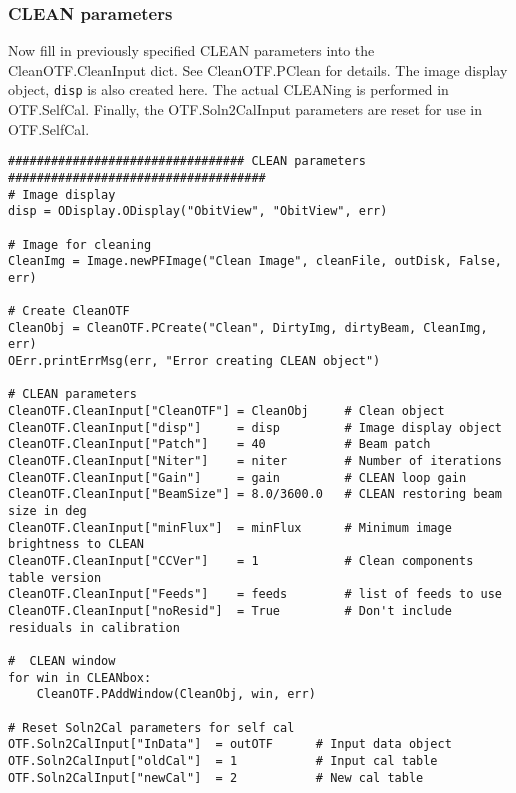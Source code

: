 \documentclass[11pt]{report}
\begin{document}
\subsubsection{CLEAN parameters}
Now fill in previously specified CLEAN parameters into the CleanOTF.CleanInput dict.
See CleanOTF.PClean for details.
The image display object, {\tt disp} is also created here.
The actual CLEANing is performed in OTF.SelfCal.
Finally, the OTF.Soln2CalInput parameters are reset for use in OTF.SelfCal.
\begin{verbatim}
################################# CLEAN parameters ####################################
# Image display
disp = ODisplay.ODisplay("ObitView", "ObitView", err)

# Image for cleaning
CleanImg = Image.newPFImage("Clean Image", cleanFile, outDisk, False, err)

# Create CleanOTF
CleanObj = CleanOTF.PCreate("Clean", DirtyImg, dirtyBeam, CleanImg, err)
OErr.printErrMsg(err, "Error creating CLEAN object")

# CLEAN parameters
CleanOTF.CleanInput["CleanOTF"] = CleanObj     # Clean object
CleanOTF.CleanInput["disp"]     = disp         # Image display object
CleanOTF.CleanInput["Patch"]    = 40           # Beam patch
CleanOTF.CleanInput["Niter"]    = niter        # Number of iterations
CleanOTF.CleanInput["Gain"]     = gain         # CLEAN loop gain
CleanOTF.CleanInput["BeamSize"] = 8.0/3600.0   # CLEAN restoring beam size in deg
CleanOTF.CleanInput["minFlux"]  = minFlux      # Minimum image brightness to CLEAN
CleanOTF.CleanInput["CCVer"]    = 1            # Clean components table version
CleanOTF.CleanInput["Feeds"]    = feeds        # list of feeds to use
CleanOTF.CleanInput["noResid"]  = True         # Don't include residuals in calibration

#  CLEAN window
for win in CLEANbox:
    CleanOTF.PAddWindow(CleanObj, win, err)

# Reset Soln2Cal parameters for self cal
OTF.Soln2CalInput["InData"]  = outOTF      # Input data object
OTF.Soln2CalInput["oldCal"]  = 1           # Input cal table
OTF.Soln2CalInput["newCal"]  = 2           # New cal table

\end{verbatim}
\end{document}
